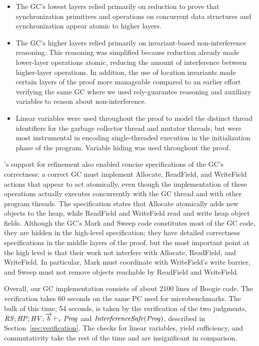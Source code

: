 \begin{itemize}
\item The GC's lowest layers relied primarily on reduction to
prove that synchronization primitives and operations on
concurrent data structures and synchronization appear atomic
to higher layers.

\item The GC's higher layers relied primarily on invariant-based non-interference reasoning.
This reasoning was simplified because reduction already made lower-layer operations atomic,
reducing the amount of interference between higher-layer operations.
In addition, the use of location invariants made certain layers of the proof more
manageable compared to an earlier effort verifying the same GC where we used
rely-guarantee reasoning and auxiliary variables to reason about
non-interference.  

\item Linear variables were used throughout the proof to model the distinct
thread identifiers for the garbage collector thread and mutator
threads, but were most instrumental in encoding single-threaded
execution in the initialization phase of the program.  
Variable hiding was used throughout the proof. 
\end{itemize}

\civl's support for refinement also enabled concise specifications of the GC's correctness:
a correct GC must implement Allocate, ReadField, and WriteField actions that appear to act atomically,
even though the implementation of these operations actually executes concurrently with the GC thread and with other program threads.
The specification states that Allocate atomically adds new objects to the heap,
while ReadField and WriteField read and write heap object fields.
Although the GC's Mark and Sweep code constitutes most of the GC code,
they are hidden in the high-level specification;
they have detailed correctness specifications in the middle layers of the proof,
but the most important point at the high level is that their work not interfere with Allocate, ReadField, and WriteField.
In particular, Mark must coordinate with WriteField's write barrier,
and Sweep must not remove objects reachable by ReadField and WriteField.

Overall, our GC implementation consists of about 2100 lines of Boogie code.
The verification takes 60 seconds on the same PC used for microbenchmarks.
The bulk of this time, 54 seconds, is taken by the verification of the two judgments,
$\mathit{RS};\mathit{HP};\mathit{HV};\overrightarrow{b} \vdash_r \mathit{Prog}$ and $\mathit{InterferenceSafe}(\mathit{Prog})$, described in Section~\ref{sec:verification}.
The checks for linear variables, yield sufficiency, and commutativity take the rest of the time and are insignificant in comparison.

